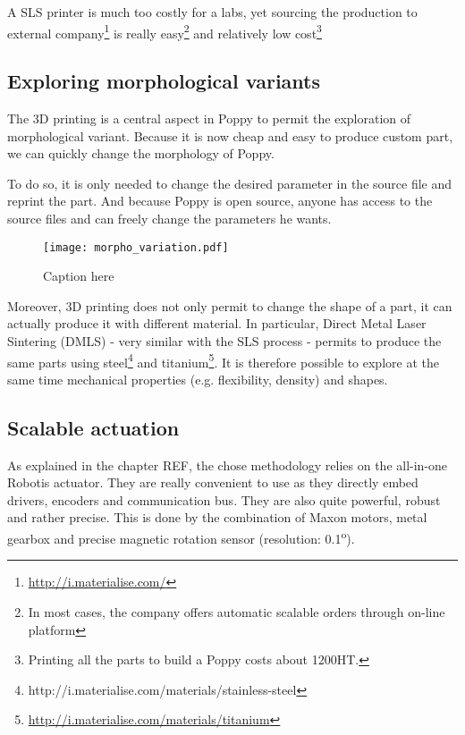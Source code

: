 A SLS printer is much too costly for a labs, yet sourcing the production to external company\footnote{\url{http://i.materialise.com/}} is really easy\footnote{In most cases, the company offers automatic scalable orders through on-line platform} and relatively low cost\footnote{Printing all the parts to build a Poppy costs about 1200\texteuro HT.}

\subsection{Exploring morphological variants} %
The 3D printing is a central aspect in Poppy to permit the exploration of morphological variant. Because it is now cheap and easy to produce custom part, we can quickly change the morphology of Poppy.

To do so, it is only needed to change the desired parameter in the source file and reprint the part. And because Poppy is open source, anyone has access to the source files and can freely change the parameters he wants.

\begin{figure}[h]
    \begin{center}
        \texttt{[image: morpho\_variation.pdf]}
    \end{center}
    \caption{Caption here}
    \label{fig:figure1}
\end{figure}


Moreover, 3D printing does not only permit to change the shape of a part, it can actually produce it with different material. In particular, Direct Metal Laser Sintering (DMLS) - very similar with the SLS process - permits to produce the same parts using steel\footnote{http://i.materialise.com/materials/stainless-steel} and titanium\footnote{\url{http://i.materialise.com/materials/titanium}}. It is therefore possible to explore at the same time mechanical properties (e.g. flexibility, density) and shapes.


\subsection{Scalable actuation} %

As explained in the chapter REF, the chose methodology relies on the all-in-one Robotis actuator. They are really convenient to use as they directly embed drivers, encoders and communication bus. They are also quite powerful, robust and rather precise. This is done by the combination of Maxon motors, metal gearbox and precise magnetic rotation sensor (resolution: 0.1\textsuperscript{o}).


